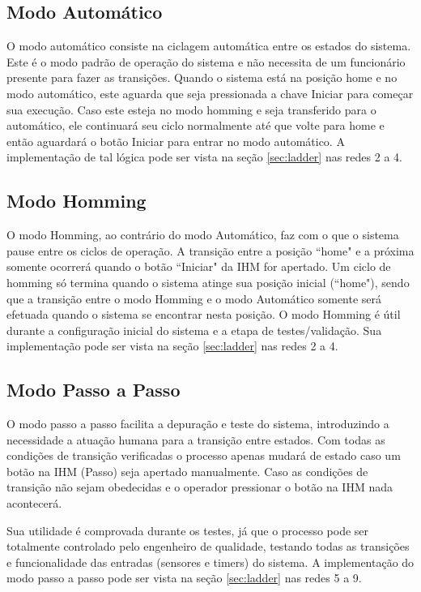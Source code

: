 \documentclass[twoside,twocolumn, 12pt]{paper}
\begin{document}
	\subsection{Modo Automático}
	O modo automático consiste na ciclagem automática entre os estados do sistema. Este é o modo padrão de operação do sistema e não necessita de um funcionário presente para fazer as transições. Quando o sistema está na posição home e no modo automático, este aguarda que seja pressionada a chave Iniciar para começar sua execução. Caso este esteja no modo homming e seja transferido para o automático, ele continuará seu ciclo normalmente até que volte para home e então aguardará o botão Iniciar para entrar no modo automático. A implementação de tal lógica pode ser vista na seção \ref{sec:ladder} nas redes 2 a 4. 
	
	\subsection{Modo Homming}
		
	O modo Homming, ao contrário do modo Automático, faz com o que o sistema pause entre os ciclos de operação. A transição entre a posição ``home" e a próxima somente ocorrerá quando o botão ``Iniciar" da IHM for apertado. Um ciclo de homming só termina quando o sistema atinge sua posição inicial (``home"), sendo que a transição entre o modo Homming e o modo Automático somente será efetuada quando o sistema se encontrar nesta posição. O modo Homming é útil durante a configuração inicial do sistema e a etapa de testes/validação. Sua implementação pode ser vista na seção \ref{sec:ladder} nas redes 2 a 4. 
	
	
	\subsection{Modo Passo a Passo}

	O modo passo a passo facilita a depuração e teste do sistema, introduzindo a necessidade a atuação humana para a transição entre estados. Com todas as condições de transição verificadas o processo apenas mudará de estado caso um botão na IHM (Passo) seja apertado manualmente. Caso as condições de transição não sejam obedecidas e o operador pressionar o botão na IHM nada acontecerá.
	
	Sua utilidade é comprovada durante os testes, já que o processo pode ser totalmente controlado pelo engenheiro de qualidade, testando todas as transições e funcionalidade das entradas (sensores e timers) do sistema. A implementação do modo passo a passo pode ser vista na seção \ref{sec:ladder} nas redes 5 a 9.
	
\end{document}
